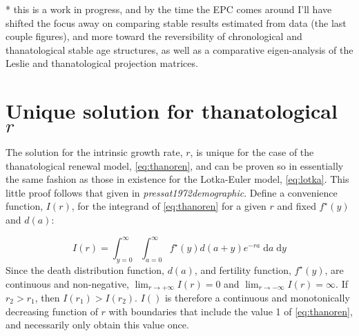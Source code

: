 \documentclass{article}
\newcommand{\dd}{\; \mathrm{d}}
\begin{document}
* this is a work in progress, and by the time the EPC comes around I'll
have shifted the focus away on comparing stable results estimated from data
(the last couple figures), and more toward the reversibility of chronological
and thanatological stable age structures, as well as a comparative
eigen-analysis of the Leslie and thanatological projection matrices.

\vspace{2em}

\appendix
\section{Unique solution for thanatological $r$}
\label{app:A}
The solution for the intrinsic growth rate, $r$, is unique for the case of the
thanatological renewal model, \eqref{eq:thanoren}, and can be proven so in
essentially the same fashion as those in existence for the Lotka-Euler model,
\eqref{eq:lotka}. This little proof follows that given in
\textit{pressat1972demographic}. Define a convenience function, $I(r)$, for the
integrand of \eqref{eq:thanoren} for a given $r$ and fixed $f^\star(y)$ and $d(a)$:

\begin{equation}
I(r) = \int_{y=0}^\infty \int_{a=0}^\infty f^\star(y) d(a+y)e^{-ra}\dd a \dd y
\end{equation}
Since the death distribution function, $d(a)$, and fertility
function, $f^\star(y)$, are continuous and non-negative, $\lim_{r \to +\infty} I(r)
= 0$ and $\lim_{r \to -\infty} I(r)= \infty$. If $r_2 > r_1$, then $I(r_1) >
I(r_2)$. $I()$ is therefore a continuous and monotonically decreasing function
of $r$ with boundaries that include the value 1 of \eqref{eq:thanoren}, and
 necessarily only obtain this value once.

\nocite{HMD,HFD}

    
\end{document}
